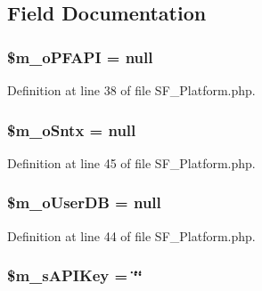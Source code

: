 \subsection{Field Documentation}
\hypertarget{classSF__Platform_a23d5b5190ee32c4eb8fff028844b1fa6}{
\subsubsection[{\$m\_\-oPFAPI}]{\setlength{\rightskip}{0pt plus 5cm}\$m\_\-oPFAPI = null}}
\label{classSF__Platform_a23d5b5190ee32c4eb8fff028844b1fa6}


Definition at line 38 of file SF\_\-Platform.php.

\hypertarget{classSF__Platform_a22d1091f94c58e3533304abe3eb9e9fe}{
\subsubsection[{\$m\_\-oSntx}]{\setlength{\rightskip}{0pt plus 5cm}\$m\_\-oSntx = null}}
\label{classSF__Platform_a22d1091f94c58e3533304abe3eb9e9fe}


Definition at line 45 of file SF\_\-Platform.php.

\hypertarget{classSF__Platform_a480a834e33015cc9a001d1d84972bb12}{
\subsubsection[{\$m\_\-oUserDB}]{\setlength{\rightskip}{0pt plus 5cm}\$m\_\-oUserDB = null}}
\label{classSF__Platform_a480a834e33015cc9a001d1d84972bb12}


Definition at line 44 of file SF\_\-Platform.php.

\hypertarget{classSF__Platform_a47530e961351765a665c4ba63e72ff3d}{
\subsubsection[{\$m\_\-sAPIKey}]{\setlength{\rightskip}{0pt plus 5cm}\$m\_\-sAPIKey = \char`\"{}\char`\"{}}}
\label{classSF__Platform_a47530e961351765a665c4ba63e72ff3d}


